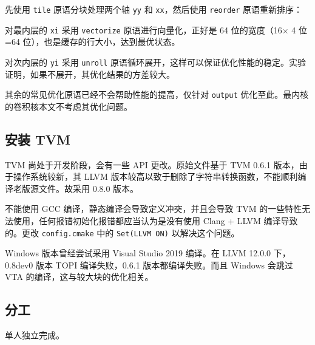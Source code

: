 \documentclass[UTF8]{ctexart}
\begin{document}


先使用 \verb"tile" 原语分块处理两个轴 \verb"yy" 和 \verb"xx"，然后使用 \verb"reorder" 原语重新排序：



对最内层的 \verb"xi" 采用 \verb"vectorize" 原语进行向量化，正好是 64 位的宽度（16$\times$ 4 位=64 位），也是缓存的行大小，达到最优状态。

对次内层的 \verb"yi" 采用 \verb"unroll" 原语循环展开，这样可以保证优化性能的稳定。实验证明，如果不展开，其优化结果的方差较大。

其余的常见优化原语已经不会帮助性能的提高，仅针对 \verb"output" 优化至此。最内核的卷积核本文不考虑其优化问题。

\subsection*{安装 TVM}

TVM 尚处于开发阶段，会有一些 API 更改。原始文件基于 TVM 0.6.1 版本，由于操作系统较新，其 LLVM 版本较高以致于删除了字符串转换函数\cite{issue}，不能顺利编译老版源文件。故采用 0.8.0 版本。

不能使用 GCC 编译，静态编译会导致定义冲突，并且会导致 TVM 的一些特性无法使用，任何报错初始化报错都应当认为是没有使用 Clang + LLVM 编译导致的。更改 \verb"config.cmake" 中的 \verb"Set(LLVM ON)" 以解决这个问题。

Windows 版本曾经尝试采用 Visual Studio 2019 编译。在 LLVM 12.0.0 下，0.8dev0 版本 TOPI 编译失败，0.6.1 版本都编译失败。而且 Windows 会跳过 VTA 的编译，这与较大块的优化相关。

\subsection*{分工}

单人独立完成。


\end{document}
